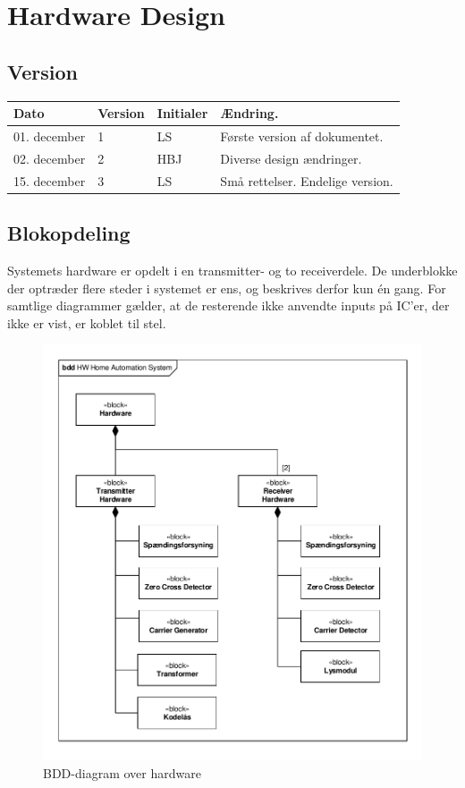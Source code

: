 \chapter{Hardware Design} \label{chap:HardwareDesign}

\section{Version}
\begin{table}[h]
	\centering
	\begin{tabularx}{\textwidth - 2cm}{|l|l| l|X|}
	\hline
	Dato	& Version	& Initialer & Ændring. \\ \hline
	01. december & 1 & LS	& Første version af dokumentet. \\ \hline
	02. december & 2 & HBJ	& Diverse design ændringer. \\ \hline
	15. december & 3 & LS & Små rettelser. Endelige version. \\ \hline
	\end{tabularx} 
\end{table}

\section{Blokopdeling}

Systemets hardware er opdelt i en transmitter- og to receiverdele. 
De underblokke der optræder flere steder i systemet er ens, og beskrives derfor kun én gang. For samtlige diagrammer gælder, at de resterende ikke anvendte inputs på IC'er, der ikke er vist, er koblet til stel.

\begin{figure}[h]
	\centering
	\includegraphics[scale=0.75, trim=10 10 10 10, clip=true]{../HardwareDesign/Diagrammer/BDD_HW.pdf}
	\caption{BDD-diagram over hardware}
	\label{fig:HWBDD}
\end{figure}

